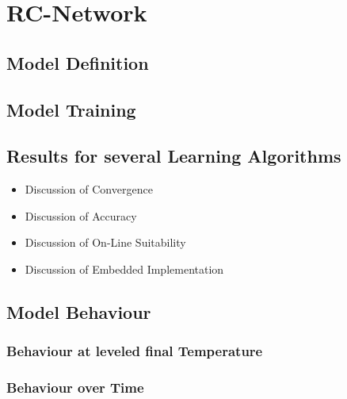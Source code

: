 \section{RC-Network}
\subsection{Model Definition}
\subsection{Model Training}
\subsection{Results for several Learning Algorithms}
\begin{itemize}
\item{Discussion of Convergence}
\item{Discussion of Accuracy}
\item{Discussion of On-Line Suitability}
\item{Discussion of Embedded Implementation}
\end{itemize}

\subsection{Model Behaviour}

\subsubsection{Behaviour at leveled final Temperature}
\subsubsection{Behaviour over Time}